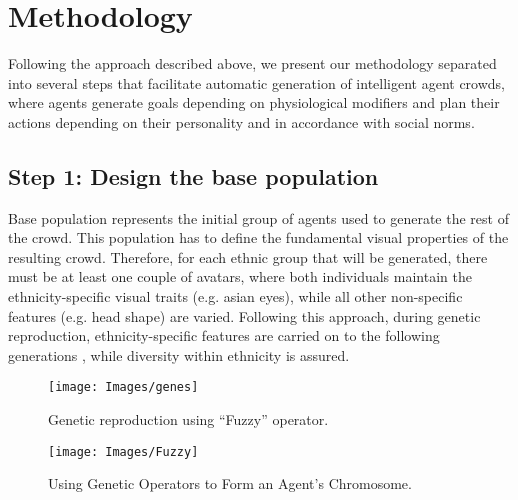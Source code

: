 \section{Methodology}
\label{sec:Methodology}


Following the approach described above,  we present our methodology separated into several steps that facilitate automatic generation of intelligent agent crowds, where agents generate goals depending on physiological modifiers and plan their actions depending on their personality and in accordance with social norms.


\subsection{Step 1: Design the base population}

\label{sec:step1}

Base population represents the initial group of agents used to generate the rest of the crowd. This population has to define the fundamental visual properties of the resulting crowd. Therefore, for each ethnic group that will be generated, there must be at least one couple of avatars, where both individuals maintain the ethnicity-specific visual traits (e.g. asian eyes), while all other non-specific features (e.g. head shape) are varied. Following this approach, during genetic reproduction, ethnicity-specific features are carried on to the following generations \cite{trescak2012v}, while diversity within ethnicity is assured.


%
\begin{figure}[!ht]
\sidecaption[t]
\texttt{[image: Images/genes]}
\caption{Genetic reproduction using ``Fuzzy'' operator.}
\label{fig:genetics}       %
\end{figure}


\begin{figure}[!ht]
\sidecaption[t]
\texttt{[image: Images/Fuzzy]}
\caption{Using Genetic Operators to Form an Agent's Chromosome.}
\label{fig:fuzzy}       %
\end{figure}

 

